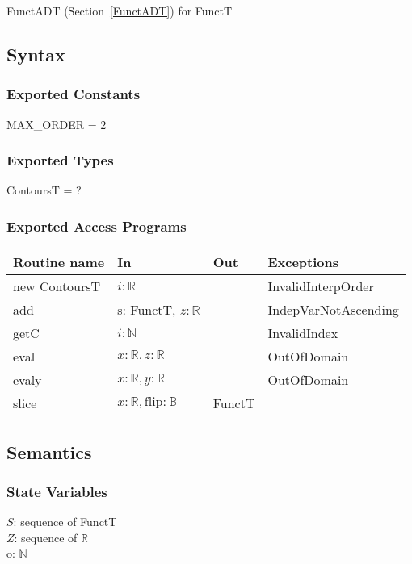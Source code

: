 \documentclass[12pt, titlepage]{article}
\begin{document}
FunctADT (Section~\ref{FunctADT}) for FunctT

\subsection {Syntax}

\subsubsection {Exported Constants}

MAX\_ORDER = 2

\subsubsection {Exported Types}

ContoursT = ?

\subsubsection {Exported Access Programs}

\begin{tabular}{| l | l | l | l |}
\hline
\textbf{Routine name} & \textbf{In} & \textbf{Out} & \textbf{Exceptions}\\
\hline
new ContoursT & $i: \mathbb{R}$ & ~ & InvalidInterpOrder\\
\hline
add & s: FunctT, $z: \mathbb{R}$ & ~ & IndepVarNotAscending\\
\hline
getC & $i: \mathbb{N}$ & ~ & InvalidIndex\\
\hline
eval & $x: \mathbb{R}, z: \mathbb{R}$ & ~ & OutOfDomain\\
\hline
evaly & $x: \mathbb{R}, y: \mathbb{R}$ & ~ & OutOfDomain\\
\hline
slice & $x: \mathbb{R}, \text{flip}: \mathbb{B}$ & FunctT & ~\\
\hline

\end{tabular}

\subsection {Semantics}

\subsubsection {State Variables}

$S$: sequence of FunctT\\
$Z$: sequence of $\mathbb{R}$\\
o: $\mathbb{N}$
\end{document}
